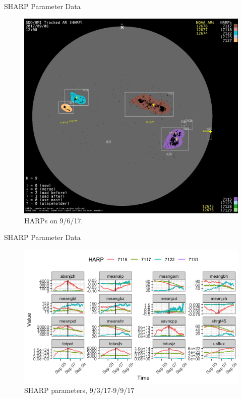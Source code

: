\documentclass{beamer}
\begin{document}
\begin{frame}{SHARP Parameter Data}
    \begin{figure}
        \centering
        \includegraphics[scale=0.19]{magnetogram_20170906.png}
        \caption{HARPs on 9/6/17.}
        \label{fig:magnetogram_20170906}
    \end{figure}
\end{frame}

\begin{frame}{SHARP Parameter Data}
    \begin{figure}
        \centering
        \includegraphics[scale=0.55]{sharp_params_20170906.png}
        \caption{SHARP parameters, 9/3/17-9/9/17}
        \label{fig:sharp_params_20170906}
    \end{figure}
\end{frame}
\end{document}
